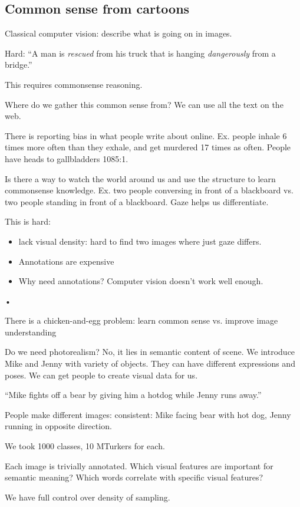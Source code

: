 \subsection{Common sense from cartoons}

Classical computer vision: describe what is going on in images.


Hard: 
``A man is \emph{rescued} from his truck that is hanging \emph{dangerously} from a bridge.''

This requires commonsense reasoning.

Where do we gather this common sense from? We can use all the text on the web.

There is reporting bias in what people write about online. Ex. people inhale 6 times more often than they exhale, and get murdered 17 times as often. People have heads to gallbladders 1085:1.

Is there a way to watch the world around us and use the structure to learn commonsense knowledge. Ex. two people conversing in front of a blackboard vs. two people standing in front of a blackboard. Gaze helps us differentiate.

This is hard:
\begin{itemize}
\item
lack visual density: hard to find two images where just gaze differs.
\item
Annotations are expensive
\item
Why need annotations? Computer vision doesn't work well enough.
\end{itemize}•

There is a chicken-and-egg problem: learn common sense vs. improve image understanding

Do we need photorealism? No, it lies in semantic content of scene. We introduce Mike and Jenny with variety of objects. They can have different expressions and poses. We can get people to create visual data for us.

``Mike fights off a bear by giving him a hotdog while Jenny runs away.''

People make different images: consistent: Mike facing bear with hot dog, Jenny running in opposite direction.

We took 1000 classes, 10 MTurkers for each. 

Each image is trivially annotated. Which visual features are important for semantic meaning? Which words correlate with specific visual features?

We have full control over density of sampling.

